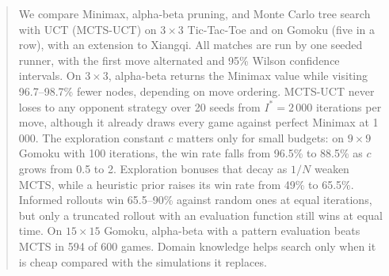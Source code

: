 \begin{abstract}
We compare Minimax, alpha-beta pruning, and Monte Carlo tree search with UCT (MCTS-UCT) on $3\times 3$ Tic-Tac-Toe and on Gomoku (five in a row), with an extension to Xiangqi. All matches are run by one seeded runner, with the first move alternated and 95\% Wilson confidence intervals. On $3\times 3$, alpha-beta returns the Minimax value while visiting 96.7--98.7\% fewer nodes, depending on move ordering. MCTS-UCT never loses to any opponent strategy over 20 seeds from $I^{*} = 2\,000$ iterations per move, although it already draws every game against perfect Minimax at 1\,000. The exploration constant $c$ matters only for small budgets: on $9\times 9$ Gomoku with 100 iterations, the win rate falls from 96.5\% to 88.5\% as $c$ grows from 0.5 to 2. Exploration bonuses that decay as $1/N$ weaken MCTS, while a heuristic prior raises its win rate from 49\% to 65.5\%. Informed rollouts win 65.5--90\% against random ones at equal iterations, but only a truncated rollout with an evaluation function still wins at equal time. On $15\times 15$ Gomoku, alpha-beta with a pattern evaluation beats MCTS in 594 of 600 games. Domain knowledge helps search only when it is cheap compared with the simulations it replaces.
\end{abstract}

